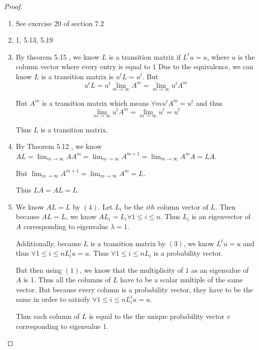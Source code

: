\documentclass{amsart}
\theoremstyle{definition}
\theoremstyle{remark}
\numberwithin{equation}{section}
\begin{document}
\begin{proof}

\begin{enumerate}

	\item See exercise 20 of section 7.2

	\item 	1, 5.13, 5.19

	\item 
			By theorem 5.15 \cite{friedberg2003linear}, we know $L$ is a transition matrix if $L^tu = u$, where $u$ is the column vector where every entry is equal to $1$
			Due to the equivalence, we can  know $L$ is a transition matrix is  $u^tL = u^t$.
			But 
			$$u^tL = u^t \lim_{m \to \infty} A^m = \lim_{m \to \infty} u^t A^m$$

			But $A^m$ is a transition matrix which means $\forall m u^t A^m = u^t$ and thus
			$$\lim_{m \to \infty} u^t A^m = \lim_{m \to \infty} u^t = u^t $$

			Thus $L$ is a transition matrix.


	\item 

			By Theorem 5.12 \cite{friedberg2003linear}, we know $AL = \lim_{m \to \infty} A A^m = \lim_{m \to \infty} A^{m+1} = \lim_{m \to \infty} A^mA  = LA$.

			But $\lim_{m \to \infty} A^{m+1} = \lim_{m \to \infty} A^{m} = L$.

			Thus $LA = AL = L$.


	\item 
			We know $AL = L$ by $(4)$.
			Let $L_i$ be the $ith$ column vector of $L$.
			Then because $AL = L$, we know $AL_i = L_i \forall 1 \leq i \leq n$.
			Thus $L_i$ is an eigenvector of $A$ corresponding to eigenvalue $\lambda = 1$.

			Additionally, because $L$ is a transition matrix by $(3)$, we know $L^tu = u$ and thus $\forall 1 \leq i \leq n L_i^t u = u$.
			Thus $\forall 1 \leq i \leq n L_i$ is a probability vector.

			But then using $(1)$, we know that the multiplicity of $1$ as an eigenvalue of $A$ is 1.
			Thus all the columns of $L$ have to be a scalar multiple of the same vector.
			But because every column is a probability vector, they have to be the same in order to satisify $\forall 1 \leq i \leq n L_i^t u = u$. 

			Thus each column of $L$ is equal to the the unique probability vector $v$ corresponding to eigenvalue $1$.


\end{enumerate}
\end{proof}
\end{document}
